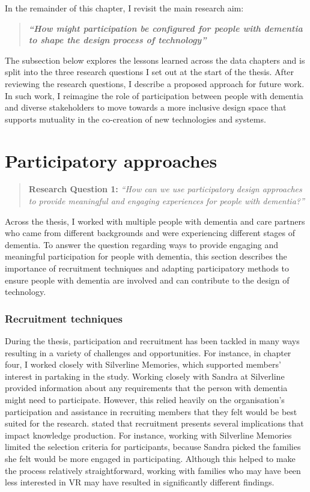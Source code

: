 In the remainder of this chapter, I revisit the main research aim:
\begin{quote}
\textbf{\textit{``How might participation be configured for people with dementia to shape the design process of technology''}}
\end{quote}

The subsection below explores the lessons learned across the data chapters and is split into the three research questions I set out at the start of the thesis. After reviewing the research questions, I describe a proposed approach for future work. In such work, I reimagine the role of participation between people with dementia and diverse stakeholders to move towards a more inclusive design space that supports mutuality in the co-creation of new technologies and systems. 

\section{Participatory approaches}
\label{Discussion:RQ1}
\begin{quote}
\textbf{    Research Question 1:
}    
\textit{    “How can we use participatory design approaches to provide meaningful and engaging experiences for people with dementia?”}
\end{quote}

Across the thesis, I worked with multiple people with dementia and care partners who came from different backgrounds and were experiencing different stages of dementia. To answer the question regarding ways to provide engaging and meaningful participation for people with dementia, this section describes the importance of recruitment techniques and adapting participatory methods to ensure people with dementia are involved and can contribute to the design of technology. 

\subsubsection{Recruitment techniques}
\label{RecruitmentTechniques}
During the thesis, participation and recruitment has been tackled in many ways resulting in a variety of challenges and opportunities. For instance, in chapter four, I worked closely with Silverline Memories, which supported members' interest in partaking in the study. Working closely with Sandra at Silverline provided information about any requirements that the person with dementia might need to participate. However, this relied heavily on the organisation's participation and assistance in recruiting members that they felt would be best suited for the research. \cite{kristensen2015voices} stated that recruitment presents several implications that impact knowledge production. For instance, working with Silverline Memories limited the selection criteria for participants, because Sandra picked the families she felt would be more engaged in participating. Although this helped to make the process relatively straightforward, working with families who may have been less interested in VR may have resulted in significantly different findings.


